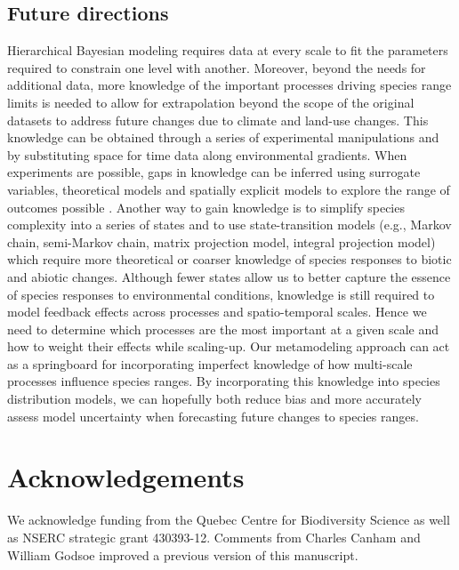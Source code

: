 \documentclass[11pt]{article}
\begin{document}
\subsection*{Future directions}
Hierarchical Bayesian modeling requires data at every scale to fit the parameters required to constrain one level with another.
Moreover, beyond the needs for additional data, more knowledge of the important processes driving species range limits is needed to allow for extrapolation beyond the scope of the original datasets to address future changes due to climate and land-use changes.
This knowledge can be obtained through a series of experimental manipulations and by substituting space for time data along environmental gradients.
When experiments are possible, gaps in knowledge can be inferred using surrogate variables, theoretical models and spatially explicit models to explore the range of outcomes possible \citep{Fortin2012}. 
Another way to gain knowledge is to simplify species complexity into a series of states and to use state-transition models (e.g., Markov chain, semi-Markov chain, matrix projection model, integral projection model) which require more theoretical or coarser knowledge of species responses to biotic and abiotic changes.
Although fewer states allow us to better capture the essence of species responses to environmental conditions, knowledge is still required to model feedback effects across processes and spatio-temporal scales.
Hence we need to determine which processes are the most important at a given scale and how to weight their effects while scaling-up.
Our metamodeling approach can act as a springboard for incorporating imperfect knowledge of how multi-scale processes influence species ranges.
By incorporating this knowledge into species distribution models, we can hopefully both reduce bias and more accurately assess model uncertainty when forecasting future changes to species ranges.

\section*{Acknowledgements}
We acknowledge funding from the Quebec Centre for Biodiversity Science as well as NSERC strategic grant 430393-12. Comments from Charles Canham and William Godsoe improved a previous version of this manuscript.


%
%
\end{document}
